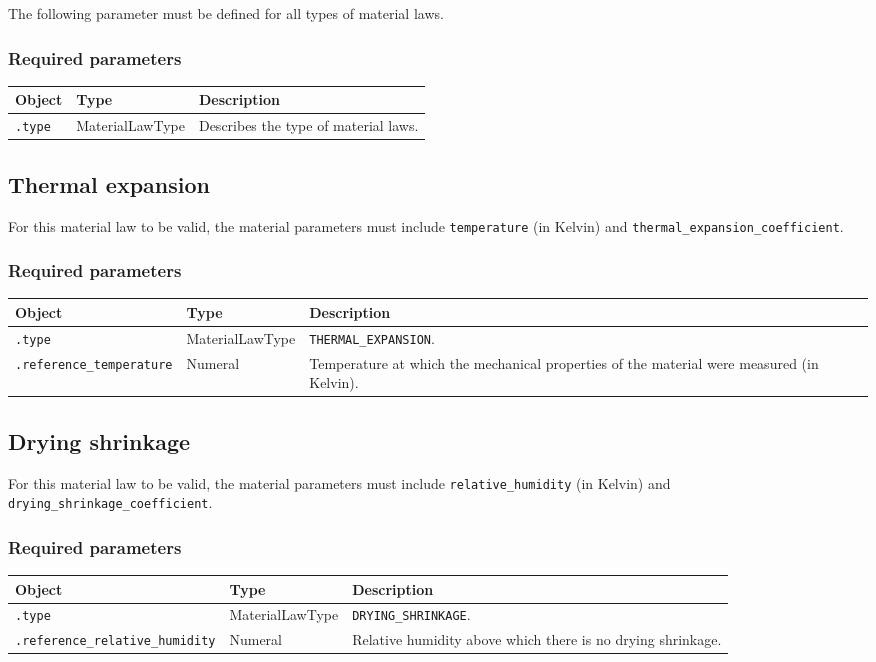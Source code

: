 \documentclass[10pt]{article}
\begin{document}
The following parameter must be defined for all types of material laws.

\subsubsection*{Required parameters}

\begin{tabularx}{\textwidth}{llX}
\hline 
Object & Type & Description \\ 
\hline 
\verb+.type+ & MaterialLawType & Describes the type of material laws. \\ 
\hline 
\end{tabularx}

\subsection{Thermal expansion}

For this material law to be valid, the material parameters must include \verb+temperature+ (in Kelvin) and \verb+thermal_expansion_coefficient+.

\subsubsection*{Required parameters}

\begin{tabularx}{\textwidth}{llX}
\hline 
Object & Type & Description \\ 
\hline 
\verb+.type+ & MaterialLawType & \verb+THERMAL_EXPANSION+. \\ 
\verb+.reference_temperature+ & Numeral & Temperature at which the mechanical properties of the material were measured (in Kelvin). \\ 
\hline 
\end{tabularx}

\subsection{Drying shrinkage}

For this material law to be valid, the material parameters must include \verb+relative_humidity+ (in Kelvin) and \verb+drying_shrinkage_coefficient+.

\subsubsection*{Required parameters}

\begin{tabularx}{\textwidth}{llX}
\hline 
Object & Type & Description \\ 
\hline 
\verb+.type+ & MaterialLawType & \verb+DRYING_SHRINKAGE+. \\ 
\verb+.reference_relative_humidity+ & Numeral & Relative humidity above which there is no drying shrinkage. \\ 
\hline 
\end{tabularx}
\end{document}
